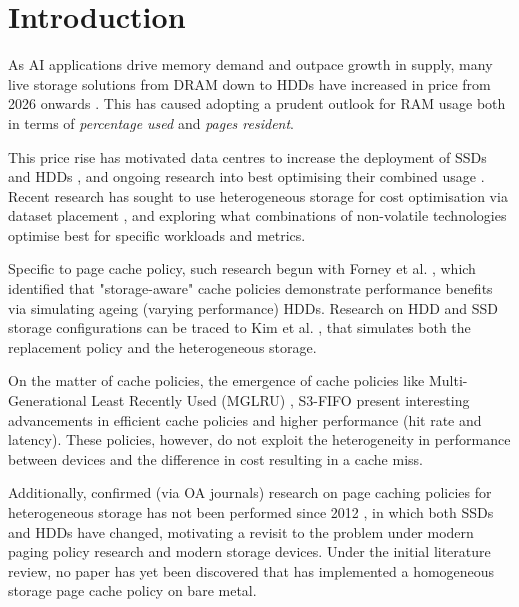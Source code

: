 \documentclass[11pt,sigconf,nonacm]{acmart}
\begin{document}
\providecommand{\tbd}[1]{\textcolor{red}{[#1]}}

\section{Introduction}


As AI applications drive memory demand and outpace growth in supply, many live storage solutions from DRAM down to HDDs have increased in price from 2026 onwards \cite{memory_prices}. This has caused adopting a prudent outlook for RAM usage both in terms of \textit{percentage used} and \textit{pages resident}.

This price rise has motivated data centres to increase the deployment of SSDs and HDDs \cite{tcostorage, ssdhddmarket}, and ongoing research into best optimising their combined usage \cite{tcostorage, heterogeneousssd}. Recent research has sought to use heterogeneous storage for cost optimisation via dataset placement \cite{tcostorage}, and exploring what combinations of non-volatile technologies optimise best for specific workloads and metrics.


Specific to page cache policy, such research begun with Forney et al. \cite{Forney}, which identified that "storage-aware" cache policies demonstrate performance benefits via simulating ageing (varying performance) HDDs. Research on HDD and SSD storage configurations can be traced to Kim et al. \cite{ssdhddfirst}, that simulates both the replacement policy and the heterogeneous storage. 

On the matter of cache policies, the emergence of cache policies like Multi-Generational Least Recently Used (MGLRU) \cite{multigenlru}, S3-FIFO \cite{yang2023s3fifo} present interesting advancements in efficient cache policies and higher performance (hit rate and latency). These policies, however, do not exploit the heterogeneity in performance between devices and the difference in cost resulting in a cache miss. 

Additionally, confirmed (via OA journals) research on page caching policies for heterogeneous storage has not been performed since 2012 \cite{lastpaper}, in which both SSDs and HDDs have changed, motivating a revisit to the problem under modern paging policy research and modern storage devices. Under the initial literature review, no paper has yet been discovered that has implemented a homogeneous storage page cache policy on bare metal.
\end{document}
